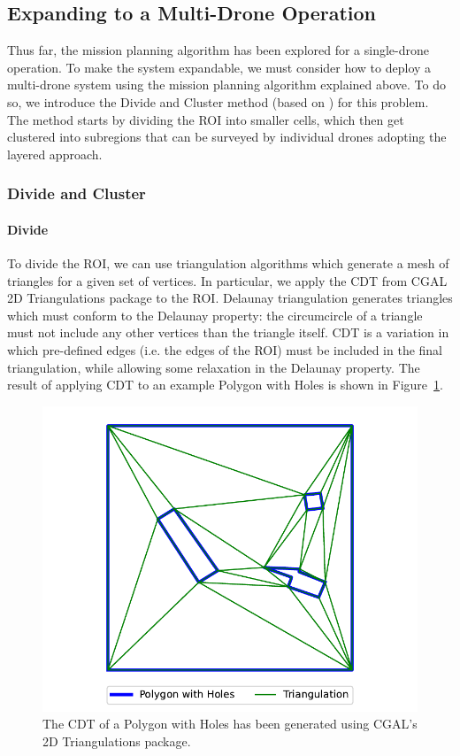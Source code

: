 \subsection{Expanding to a Multi-Drone Operation}
\label{sec:msp_multi_drone}

Thus far, the mission planning algorithm has been explored for a single-drone operation. To make the system expandable, we must consider how to deploy a multi-drone system using the mission planning algorithm explained above. To do so, we introduce the Divide and Cluster method (based on \cite{skorobogatov2021multi}) for this problem. The method starts by dividing the \gls{ROI} into smaller cells, which then get clustered into subregions that can be surveyed by individual drones adopting the layered approach.

\subsubsection{Divide and Cluster}

\paragraph{Divide} To divide the \gls{ROI}, we can use triangulation algorithms which generate a mesh of triangles for a given set of vertices. In particular, we apply the \gls{CDT} from \gls{CGAL} 2D Triangulations package \cite{cgal2024triangulation} to the \gls{ROI}. Delaunay triangulation generates triangles which must conform to the Delaunay property: the circumcircle of a triangle must not include any other vertices than the triangle itself. \gls{CDT} is a variation in which pre-defined edges (i.e. the edges of the \gls{ROI}) must be included in the final triangulation, while allowing some relaxation in the Delaunay property. The result of applying \gls{CDT} to an example Polygon with Holes is shown in Figure~\ref{fig:msp_cdt}. 

\begin{figure}[h!]
    \centering
    \includegraphics[width=0.6\linewidth]{figs/Jihwan/cdt.pdf}
    \caption[Constrained Delaunay Triangulation of Polygon with Holes]
    {The \gls{CDT} of a Polygon with Holes has been generated using \gls{CGAL}'s 2D Triangulations package.}
    \label{fig:msp_cdt}
\end{figure}

